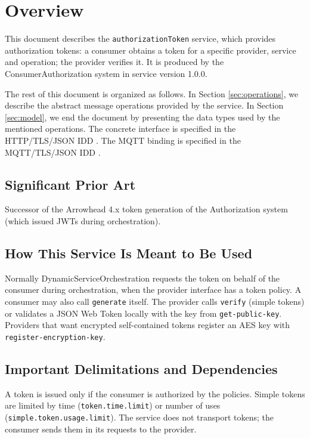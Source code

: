 \documentclass[a4paper]{arrowhead}
\begin{document}
\section{Overview}
\label{sec:overview}

This document describes the \texttt{authorizationToken} service, which provides authorization tokens: a consumer obtains a token for a specific provider, service and operation; the provider verifies it.
It is produced by the ConsumerAuthorization system \cite{ca-sysd} in service version 1.0.0.

The rest of this document is organized as follows.
In Section \ref{sec:operations}, we describe the abstract message operations provided by the service.
In Section \ref{sec:model}, we end the document by presenting the data types used by the mentioned operations.
The concrete interface is specified in the HTTP/TLS/JSON IDD \cite{ca-authorizationToken-http-idd}. The MQTT binding is specified in the MQTT/TLS/JSON IDD \cite{ca-authorizationToken-mqtt-idd}.

\subsection{Significant Prior Art}

Successor of the Arrowhead 4.x token generation of the Authorization system (which issued JWTs during orchestration).

\subsection{How This Service Is Meant to Be Used}

Normally Dynamic\allowbreak{}Service\allowbreak{}Orchestration requests the token on behalf of the consumer during orchestration, when the provider interface has a token policy. A consumer may also call \texttt{generate} itself. The provider calls \texttt{verify} (simple tokens) or validates a JSON Web Token locally with the key from \texttt{get-\allowbreak{}public-\allowbreak{}key}. Providers that want encrypted self-contained tokens register an AES key with \texttt{register-\allowbreak{}encryption-\allowbreak{}key}.

\subsection{Important Delimitations and Dependencies}
\label{sec:delimitations}

A token is issued only if the consumer is authorized by the policies. Simple tokens are limited by time (\texttt{token.\allowbreak{}time.\allowbreak{}limit}) or number of uses (\texttt{simple.\allowbreak{}token.\allowbreak{}usage.\allowbreak{}limit}). The service does not transport tokens; the consumer sends them in its requests to the provider.
\end{document}
